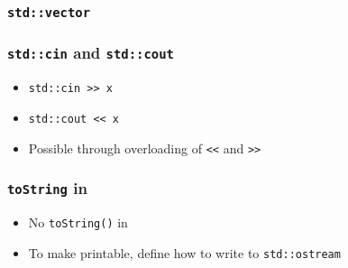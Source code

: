 \begin{frame}
  \frametitle{\tt std::vector}
\end{frame}

\begin{frame}
  \frametitle{{\tt std::cin} and {\tt std::cout}}
  \begin{itemize}
    \item {\tt std::cin >> x}
    \item {\tt std::cout << x}
    \item Possible through overloading of {\tt <<} and {\tt >>}
  \end{itemize}
\end{frame}

\begin{frame}
  \frametitle{{\tt toString} in \cpp}
  \begin{itemize}
    \item No {\tt toString()} in \cpp
    \item To make printable, define how to write to {\tt std::ostream}
  \end{itemize}
\end{frame}





